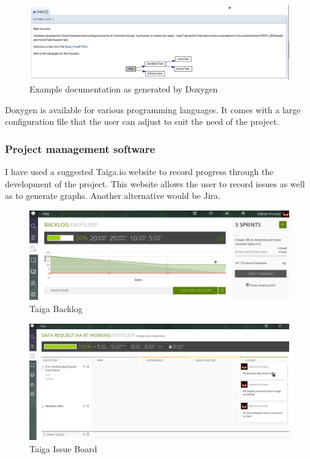 \documentclass[12pt,a4paper]{article}
\begin{document}
            \begin{figure}[h]
                \centering
                \includegraphics[width=\textwidth]{doxygen_main_dev2.png}
                \caption{Example documentation as generated by Doxygen}
                \label{fig:doxygenMain}
            \end{figure}
            
            
            Doxygen is available for various programming languages. It comes with a large configuration 
            file that the user can adjust to suit the need of the project.
            
            \subsubsection{Project management software}
            I have used a suggested Taiga.io website to record progress through the development of the project. This website allows the user to record issues as well as to generate graphs. Another alternative would be Jira.\newpage
            \begin{figure}[h]
             \centering
             \includegraphics[width=\textwidth]{taiga.png}
             \caption{Taiga Backlog}
             \label{fig:taigaBacklog}
            \end{figure}
            
            \begin{figure}[h]
             \centering
             \includegraphics[width=\textwidth]{taiga1.png}
             \caption{Taiga Issue Board}
             \label{fig:taigaIssuBoard}
            \end{figure}
\end{document}

